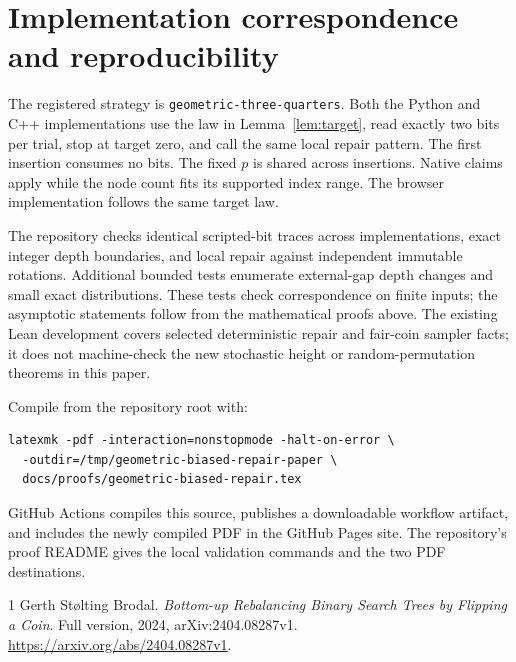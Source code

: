 \documentclass[11pt]{article}
\begin{document}
\section{Implementation correspondence and reproducibility}\label{sec:reproduce}
The registered strategy is \texttt{geometric-three-quarters}.
Both the Python and C++ implementations use the law in Lemma~\ref{lem:target},
read exactly two bits per trial, stop at target zero, and call the same local
repair pattern. The first insertion consumes no bits. The fixed $p$ is shared
across insertions. Native claims apply while the node count fits its supported
index range. The browser implementation follows the same target law.

The repository checks identical scripted-bit traces across implementations,
exact integer depth boundaries, and local repair against independent immutable
rotations. Additional bounded tests enumerate external-gap depth changes and
small exact distributions. These tests check correspondence on finite inputs;
the asymptotic statements follow from the mathematical proofs above. The
existing Lean development covers selected deterministic repair and fair-coin
sampler facts; it does not machine-check the new stochastic height or
random-permutation theorems in this paper.

Compile from the repository root with:
\begin{lstlisting}[mathescape=false,basicstyle=\footnotesize\ttfamily]
latexmk -pdf -interaction=nonstopmode -halt-on-error \
  -outdir=/tmp/geometric-biased-repair-paper \
  docs/proofs/geometric-biased-repair.tex
\end{lstlisting}
GitHub Actions compiles this source, publishes a downloadable workflow artifact,
and includes the newly compiled PDF in the GitHub Pages site. The repository's
proof README gives the local validation commands and the two PDF destinations.

\begin{thebibliography}{1}
Gerth St\o lting Brodal.
\emph{Bottom-up Rebalancing Binary Search Trees by Flipping a Coin}.
Full version, 2024, arXiv:2404.08287v1.
\url{https://arxiv.org/abs/2404.08287v1}.
\end{thebibliography}
\end{document}
